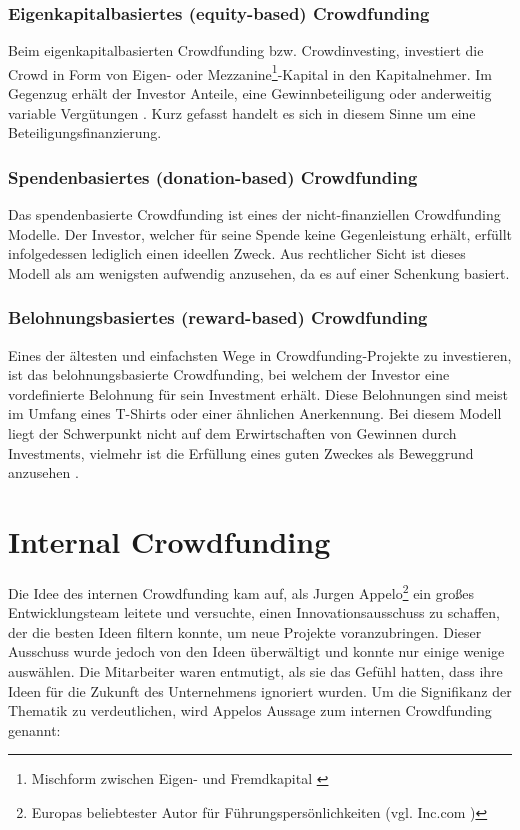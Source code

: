 \subsubsection*{Eigenkapitalbasiertes (equity-based) Crowdfunding}
Beim eigenkapitalbasierten Crowdfunding bzw. Crowdinvesting, investiert die Crowd in Form von Eigen- oder Mezzanine\footnote{Mischform zwischen Eigen- und Fremdkapital \cite{Schrecker2012}}-Kapital in den Kapitalnehmer. Im Gegenzug erhält der Investor Anteile, eine Gewinnbeteiligung oder anderweitig variable Vergütungen \cites[13]{Guenther2019}[195\psq]{Looy2015}. Kurz gefasst handelt es sich in diesem Sinne um eine Beteiligungsfinanzierung.
\subsubsection*{Spendenbasiertes (donation-based) Crowdfunding}
Das spendenbasierte Crowdfunding ist eines der nicht-finanziellen Crowdfunding Modelle. Der Investor, welcher für seine Spende keine Gegenleistung erhält, erfüllt infolgedessen lediglich einen ideellen Zweck. Aus rechtlicher Sicht ist dieses Modell als am wenigsten aufwendig anzusehen, da es auf einer Schenkung basiert. \cite[15\psq]{Guenther2019}
\subsubsection*{Belohnungsbasiertes (reward-based) Crowdfunding}
Eines der ältesten und einfachsten Wege in Crowdfunding-Projekte zu investieren, ist das belohnungsbasierte Crowdfunding, bei welchem der Investor eine vordefinierte Belohnung für sein Investment erhält. Diese Belohnungen sind meist im Umfang eines T-Shirts oder einer ähnlichen Anerkennung. %
 Bei diesem Modell liegt der Schwerpunkt nicht auf dem Erwirtschaften von Gewinnen durch Investments, vielmehr ist die Erfüllung eines guten Zweckes als Beweggrund anzusehen \cites[196]{Looy2015}{Guenther2019}.

\section{Internal Crowdfunding}\label{sec:internal_crowdfunding}
Die Idee des internen Crowdfunding kam auf, als Jurgen Appelo\footnote{Europas beliebtester Autor für Führungspersönlichkeiten (vgl. Inc.com \cites{leadership_experts}{leadership_speakers})} ein großes Entwicklungsteam leitete und versuchte, einen Innovationsausschuss zu schaffen, der die besten Ideen filtern konnte, um neue Projekte voranzubringen. Dieser Ausschuss wurde jedoch von den Ideen überwältigt und konnte nur einige wenige auswählen. Die Mitarbeiter waren entmutigt, als sie das Gefühl hatten, dass ihre Ideen für die Zukunft des Unternehmens ignoriert wurden. Um die Signifikanz der Thematik zu verdeutlichen, wird Appelos Aussage zum internen Crowdfunding genannt:

